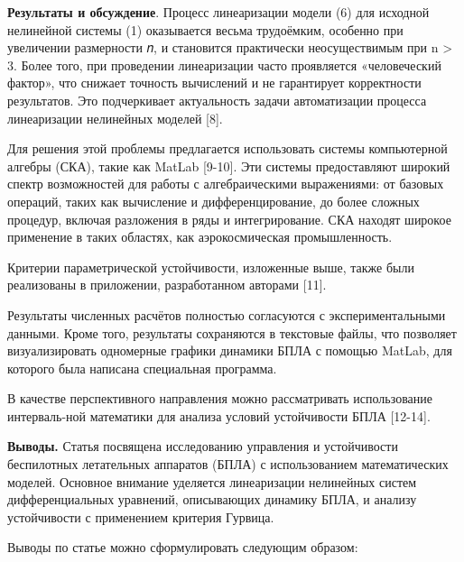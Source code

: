 \begin{multicols}{2}

{\bfseries Результаты и обсуждение}. Процесс линеаризации модели (6) для
исходной нелинейной системы (1) оказывается весьма трудоёмким, особенно
при увеличении размерности 𝑛, и становится практически неосуществимым
при n \textgreater{} 3. Более того, при проведении линеаризации часто
проявляется «человеческий фактор», что снижает точность вычислений и не
гарантирует корректности результатов. Это подчеркивает актуальность
задачи автоматизации процесса линеаризации нелинейных моделей {[}8{]}.

Для решения этой проблемы предлагается использовать системы компьютерной
алгебры (СКА), такие как MatLab {[}9-10{]}. Эти системы предоставляют
широкий спектр возможностей для работы с алгебраическими выражениями: от
базовых операций, таких как вычисление и дифференцирование, до более
сложных процедур, включая разложения в ряды и интегрирование. СКА
находят широкое применение в таких областях, как аэрокосмическая
промышленность.

Критерии параметрической устойчивости, изложенные выше, также были
реализованы в приложении, разработанном авторами {[}11{]}.

Результаты численных расчётов полностью согласуются с экспериментальными
данными. Кроме того, результаты сохраняются в текстовые файлы, что
позволяет визуализировать одномерные графики динамики БПЛА с помощью
MatLab, для которого была написана специальная программа.

В качестве перспективного направления можно рассматривать использование
интерваль-ной математики для анализа условий устойчивости БПЛА
{[}12-14{]}.

{\bfseries Выводы.} Статья посвящена исследованию управления и устойчивости
беспилотных летательных аппаратов (БПЛА) с использованием математических
моделей. Основное внимание уделяется линеаризации нелинейных систем
дифференциальных уравнений, описывающих динамику БПЛА, и анализу
устойчивости с применением критерия Гурвица.

Выводы по статье можно сформулировать следующим образом:


\end{multicols}
